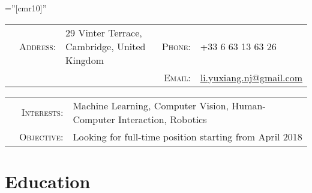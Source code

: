 \documentclass[a4paper,10pt]{article} %
\begin{document}
\pagestyle{empty} %

\font\fb=''[cmr10]'' %


\par{} %
\vspace{0.1cm}

\begin{tabular}{@{}p{0.66cm}rp{8.75cm}rl}
& \textsc{Address:} & 29 Vinter Terrace, Cambridge, United Kingdom & \textsc{Phone:} & +33 6 63 13 63 26 \\
& & & \textsc{Email:} & \href{mailto:li.yuxiang.nj@gmail.com}{li.yuxiang.nj@gmail.com}
\end{tabular}

\begin{tabular}{p{0.205cm}rl}
& \textsc{Interests:} & Machine Learning, Computer Vision, Human-Computer Interaction, Robotics \\
& \textsc{Objective:} & Looking for full-time position starting from April 2018
\end{tabular}


\section{Education}
\end{document}
